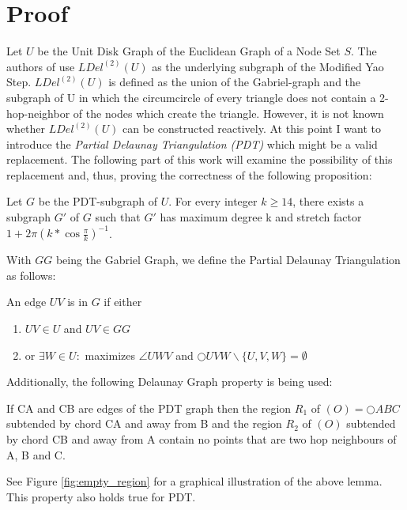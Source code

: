 \section{Proof}
Let $U $ be the Unit Disk Graph of the Euclidean Graph of a Node Set $S $.
The authors of \cite{kanj} use $LDel^{(2)}(U) $ as the underlying subgraph of the Modified Yao Step.
$LDel^{(2)}(U) $ is defined as the union of the Gabriel-graph and the subgraph of U in which the circumcircle of every triangle does not contain a 2-hop-neighbor of the nodes which create the triangle.
However, it is not known whether $LDel^{(2)}(U) $ can be constructed reactively.
At this point I want to introduce the \emph{Partial Delaunay Triangulation (PDT)} \cite{pdt} which might be a valid replacement.
The following part of this work will examine the possibility of this replacement and, thus, proving the correctness of the following proposition:

\begin{prop}
\label{mastertheorem}
Let $G $ be the PDT-subgraph of $U $.
For every integer $k \geq 14 $, there exists a subgraph $G' $ of $G $ such that $G' $ has maximum degree k and stretch factor $1+2\pi (k*\cos{\frac{\pi}{k}})^{-1} $.
\end{prop} 



With $GG $ being the Gabriel Graph, we define the Partial Delaunay Triangulation as follows:
\begin{definition}
\label{emptycircle}
An edge $UV $ is in $G $ if either 
\begin{enumerate}
\renewcommand{\labelenumi}{(\roman{enumi})}
 \item $UV \in U$ and $UV \in GG $
 \item or $\exists{W} \in U : $ maximizes $\angle{UWV} $ and $\bigcirc{UVW}  \backslash \{U, V, W\} = \emptyset $
\end{enumerate} 
\end{definition}


Additionally, the following Delaunay Graph property is being used:
\begin{lemma}
\label{emptyregion}
If CA and CB are edges of the PDT graph then the region $R_1 $ of $(O)=\bigcirc{ABC} $ subtended by chord CA and away from B and the region $R_2 $ of $(O) $ subtended by chord CB and away from A contain no points that are two hop neighbours of A, B and C.
\end{lemma}


See Figure \ref{fig:empty_region} for a graphical illustration of the above lemma.
This property also holds true for PDT.

